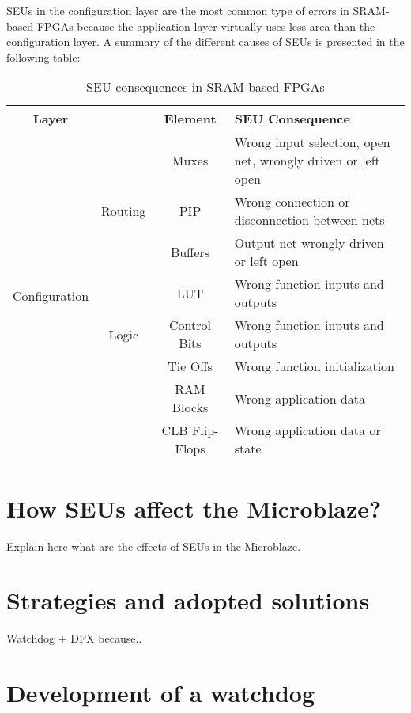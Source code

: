 SEUs in the configuration layer are the most common type of errors in SRAM-based FPGAs because the application layer virtually uses less area than the configuration layer. A summary of the different causes of SEUs is presented in the following table:

\begin{table}[H]
\centering
    \begin{tabular}{|cc|cp{6.2cm}|}
        \hline
        \textbf{Layer} & & \textbf{Element} & \textbf{SEU Consequence} \\
        \hline
        \multirow{12}{*}{Configuration}
        & & Muxes & Wrong input selection, open net, wrongly driven or left open\\
        \cline{3-4}
        & Routing & PIP & Wrong connection or disconnection between nets\\
        \cline{3-4}
        & & Buffers & Output net wrongly driven or left open\\
        \cline{2-4}
        & & LUT & Wrong function inputs and outputs \\
        \cline{3-4}
        & Logic & Control Bits & Wrong function inputs and outputs\\
        \cline{3-4}
        & & Tie Offs & Wrong function initialization\\
        \hline
        \multirow{2}{*}{Application}
        & & RAM Blocks & Wrong application data\\
        \cline{3-4}
        & & CLB Flip-Flops & Wrong application data or state\\
        \hline
    \end{tabular}
\caption{SEU consequences in SRAM-based FPGAs \cite{10.1145/1046192.1046212}}
\label{tab:conseq_fpgas_seu}
\end{table}

\section{How SEUs affect the Microblaze?}

Explain here what are the effects of SEUs in the Microblaze.

\section{Strategies and adopted solutions}
Watchdog + DFX because..

\section{Development of a watchdog}

